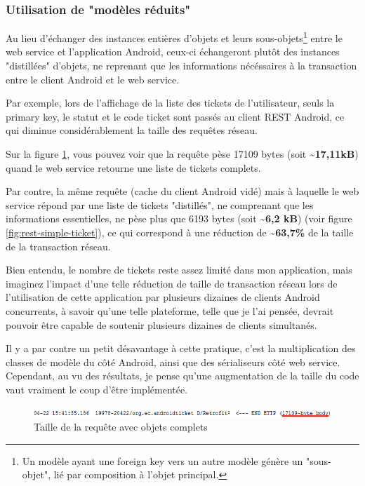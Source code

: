 \documentclass[12pt,table,a4paper]{report}
\begin{document}
\subsubsection{Utilisation de "modèles réduits"}
Au lieu d'échanger des instances entières d'objets et leurs sous-objets\footnote{Un modèle ayant une foreign key vers un autre modèle génère un "sous-objet", lié par composition à l'objet principal.} entre le web service et l'application Android, ceux-ci échangeront plutôt des instances "distillées" d'objets, ne reprenant que les informations nécéssaires à la transaction entre le client Android et le web service.

Par exemple, lors de l'affichage de la liste des tickets de l'utilisateur, seuls la primary key, le statut et le code ticket sont passés au client REST Android, ce qui diminue considérablement la taille des requêtes réseau.

Sur la figure \ref{fig:rest-full-ticket}, vous pouvez voir que la requête pèse 17109 bytes (soit \textbf{\textasciitilde17,11kB}) quand le web service retourne une liste de tickets complets. 

Par contre, la même requête (cache du client Android vidé) mais à laquelle le web service répond par une liste de tickets "distillés", ne comprenant que les informations essentielles, ne pèse plus que 6193 bytes (soit \textbf{\textasciitilde6,2 kB}) (voir figure \ref{fig:rest-simple-ticket}), ce qui correspond à une réduction de \textbf{\textasciitilde63,7\%} de la taille de la transaction réseau.

Bien entendu, le nombre de tickets reste assez limité dans mon application, mais imaginez l'impact d'une telle réduction de taille de transaction réseau lors de l'utilisation de cette application par plusieurs dizaines de clients Android concurrents, à savoir qu'une telle plateforme, telle que je l'ai pensée, devrait pouvoir être capable de soutenir plusieurs dizaines de clients simultanés.

Il y a par contre un petit désavantage à cette pratique, c'est la multiplication des classes de modèle du côté Android, ainsi que des sérialiseurs côté web service. Cependant, au vu des résultats, je pense qu'une augmentation de la taille du code vaut vraiment le coup d'être implémentée. 

\begin{figure}[t]
\centering
\includegraphics[width=1.0\textwidth]{images/screenshots/proofs/comparaison-rest-full-ticket.png}
\caption{Taille de la requête avec objets complets}
\label{fig:rest-full-ticket}
\end{figure}
\end{document}
